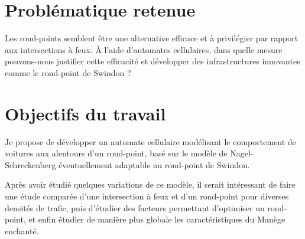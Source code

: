 \documentclass[11pt,a4paper,french]{article}
\begin{document}
\section*{Problématique retenue}

Les rond-points semblent être une alternative efficace et à privilégier par rapport aux intersections à feux. À l'aide d'automates cellulaires, dans quelle mesure pouvons-nous justifier cette efficacité et développer des infrastructures innovantes comme le rond-point de Swindon ?

\section*{Objectifs du travail}
Je propose de développer un automate cellulaire modélisant le comportement de voitures aux alentours d'un rond-point, basé sur le modèle de Nagel-Schreckenberg éventuellement adaptable au rond-point de Swindon. \par
Après avoir étudié quelques variations de ce modèle, il serait intéressant de faire une étude comparée d'une intersection à feux et d'un rond-point pour diverses densités de trafic, puis d'étudier des facteurs permettant d'optimiser un rond-point, et enfin étudier de manière plus globale les caractéristiques du Manège enchanté.


\renewcommand{\refname}{Bibliographie}


\end{document}
